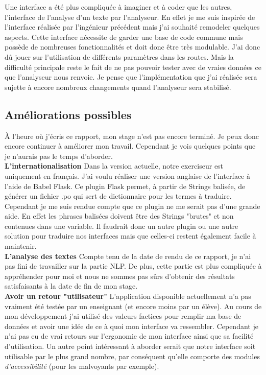 \documentclass[12pt]{article}
\begin{document}
Une interface a été plus compliquée à imaginer et à coder que les autres, l'interface de l'analyse d'un texte par l'analyseur. En effet je me suis inspirée de l'interface réalisée par l'ingénieur précédent mais j'ai souhaité remodeler quelques aspects. Cette interface nécessite de garder une base de code commune mais possède de nombreuses fonctionnalités et doit donc être très modulable. J'ai donc dû jouer sur l'utilisation de différents paramètres dans les routes. Mais la difficulté principale reste le fait de ne pas pouvoir tester avec de vraies données ce que l'analyseur nous renvoie. Je pense que l'implémentation que j'ai réalisée sera sujette à encore nombreux changements quand l'analyseur sera stabilisé. 

\subsection{Améliorations possibles}
À l’heure où j’écris ce rapport, mon stage n’est pas encore terminé. Je peux donc encore continuer à améliorer mon travail. Cependant je vois quelques points que je n’aurais pas le temps d’aborder. \\

\textbf{L’internationalisation} Dans la version actuelle, notre exerciseur est uniquement en français. J’ai voulu réaliser une version anglaise de l’interface à l’aide de Babel Flask. Ce plugin Flask permet, à partir de Strings balisée, de générer un fichier .po qui sert de dictionnaire pour les termes à traduire. Cependant je me suis rendue compte que ce plugin ne me serait pas d’une grande aide. En effet les phrases balisées doivent être des Strings "brutes" et non contenues dans une variable. Il faudrait donc un autre plugin ou une autre solution pour traduire nos interfaces mais que celles-ci restent également facile à maintenir. \\

\textbf{L'analyse des textes}  Compte tenu de la date de rendu de ce rapport, je n'ai pas fini de travailler sur la partie NLP. De plus, cette partie est plus compliquée à appréhender pour moi et nous ne sommes pas sûrs d'obtenir des résultats satisfaisants à la date de fin de mon stage. \\

\textbf{Avoir un retour "utilisateur"} L'application disponible actuellement n'a pas vraiment été testée par un enseignant (et encore moins par un élève). Au cours de mon développement j'ai utilisé des valeurs factices pour remplir ma base de données et avoir une idée de ce à quoi mon interface va ressembler. Cependant je n'ai pas eu de vrai retours sur l'ergonomie de mon interface ainsi que sa facilité d'utilisation. 
Un autre point intéressant à aborder serait que notre interface soit utilisable par le plus grand nombre, par conséquent qu'elle comporte des modules \textit{d'accessibilité} (pour les malvoyants par exemple). 
\end{document}
